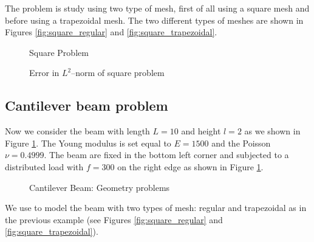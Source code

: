The problem is study using two type of mesh, first of all using a square mesh and before using a trapezoidal mesh.
The two different types of meshes are shown in Figures \ref{fig:square_regular} and \ref{fig:square_trapezoidal}.
%
\begin{figure}[!ht]
\begin{center}
\hspace{5pt}
\caption{Square Problem}
\end{center}
\end{figure}
%
\begin{figure}[!ht]
\begin{center}
\caption{Error in $L^{2}$--norm of square problem}
\end{center}
\end{figure}

%



\subsection{Cantilever beam problem}
Now we consider the beam with length $L=10$ and height $l=2$ as we shown in Figure \ref{fig:beam}. The Young modulus is set equal to $E=1500$ and the Poisson $\nu=0.4999$.
The beam are fixed in the bottom left corner and subjected to a distributed load with $f=300$ on the right edge as shown in Figure \ref{fig:beam}.
\begin{figure}[!ht]
\begin{center}

\caption{Cantilever Beam: Geometry problems \label{fig:beam}}
\end{center}
\end{figure}
We use to model the beam with two types of mesh: regular and trapezoidal as in the previous example (see Figures \ref{fig:square_regular} and \ref{fig:square_trapezoidal}).

